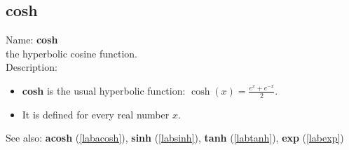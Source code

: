 \subsection{cosh}
\label{labcosh}
\noindent Name: \textbf{cosh}\\
the hyperbolic cosine function.\\
\noindent Description: \begin{itemize}

\item \textbf{cosh} is the usual hyperbolic function: $\cosh(x) = \frac{e^x + e^{-x}}{2}$.

\item It is defined for every real number $x$.
\end{itemize}
See also: \textbf{acosh} (\ref{labacosh}), \textbf{sinh} (\ref{labsinh}), \textbf{tanh} (\ref{labtanh}), \textbf{exp} (\ref{labexp})
